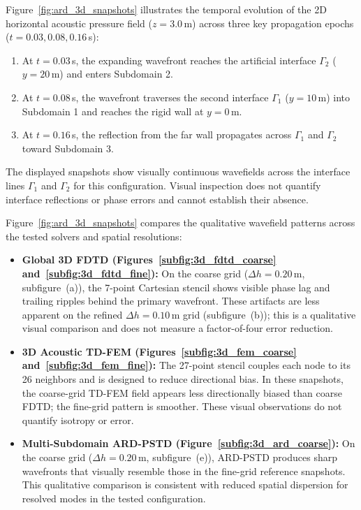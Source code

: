 \documentclass{Configuration_Files/PoliMi3i_thesis}
\newif\ifshowthesischanges
\DeclareRobustCommand{\thesischange}[2]{%
    \ifshowthesischanges
        \textcolor{#1}{#2}%
    \else
        #2%
    \fi
}
\def\thesischange#1#2{#2}%
\begin{document}
\thesischange{red}{Figure~\ref{fig:ard_3d_snapshots} illustrates the temporal evolution of the 2D horizontal acoustic pressure field ($z = 3.0$\,m) across three key propagation epochs ($t = 0.03, 0.08, 0.16$\,s):}
\begin{enumerate}
    \item \thesischange{red}{At $t = 0.03$\,s, the expanding wavefront reaches the artificial interface $\Gamma_2$ ($y = 20$\,m) and enters Subdomain 2.}
    \item \thesischange{red}{At $t = 0.08$\,s, the wavefront traverses the second interface $\Gamma_1$ ($y = 10$\,m) into Subdomain 1 and reaches the rigid wall at $y = 0$\,m.}
    \item \thesischange{red}{At $t = 0.16$\,s, the reflection from the far wall propagates across $\Gamma_1$ and $\Gamma_2$ toward Subdomain 3.}
\end{enumerate}
 \thesischange{red}{The displayed snapshots show visually continuous wavefields across the interface lines $\Gamma_1$ and $\Gamma_2$ for this configuration. Visual inspection does not quantify interface reflections or phase errors and cannot establish their absence.}

\thesischange{red}{Figure~\ref{fig:ard_3d_snapshots} compares the qualitative wavefield patterns across the tested solvers and spatial resolutions:}
\begin{itemize}
    \item \thesischange{red}{\textbf{Global 3D FDTD (Figures~\ref{subfig:3d_fdtd_coarse} and~\ref{subfig:3d_fdtd_fine}):} On the coarse grid ($\Delta h = 0.20$\,m, subfigure~(a)), the 7-point Cartesian stencil shows visible phase lag and trailing ripples behind the primary wavefront. These artifacts are less apparent on the refined $\Delta h = 0.10$\,m grid (subfigure~(b)); this is a qualitative visual comparison and does not measure a factor-of-four error reduction.}
    \item \thesischange{red}{\textbf{3D Acoustic TD-FEM (Figures~\ref{subfig:3d_fem_coarse} and~\ref{subfig:3d_fem_fine}):} The 27-point stencil couples each node to its 26 neighbors and is designed to reduce directional bias. In these snapshots, the coarse-grid TD-FEM field appears less directionally biased than coarse FDTD; the fine-grid pattern is smoother. These visual observations do not quantify isotropy or error.}
    \item \thesischange{red}{\textbf{Multi-Subdomain ARD-PSTD (Figure~\ref{subfig:3d_ard_coarse}):} On the coarse grid ($\Delta h = 0.20$\,m, subfigure~(e)), ARD-PSTD produces sharp wavefronts that visually resemble those in the fine-grid reference snapshots. This qualitative comparison is consistent with reduced spatial dispersion for resolved modes in the tested configuration.}
\end{itemize}
\end{document}
